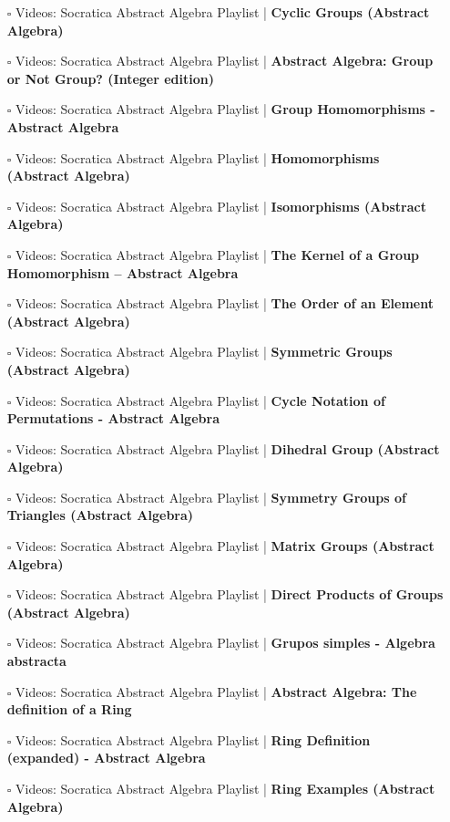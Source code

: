 \documentclass[a4, landscape, 12pt]{article}
\newcommand{\checkbox}{$\square$}%
\begin{document}
\begin{itemize}
{}
\item [\checkbox] Videos: Socratica Abstract Algebra Playlist  | \textbf{Cyclic Groups (Abstract Algebra)
}
\item [\checkbox] Videos: Socratica Abstract Algebra Playlist  | \textbf{Abstract Algebra: Group or Not Group? (Integer edition)
}
\item [\checkbox] Videos: Socratica Abstract Algebra Playlist  | \textbf{Group Homomorphisms - Abstract Algebra
}
\item [\checkbox] Videos: Socratica Abstract Algebra Playlist  | \textbf{Homomorphisms (Abstract Algebra)
}
\item [\checkbox] Videos: Socratica Abstract Algebra Playlist  | \textbf{Isomorphisms (Abstract Algebra)
}
\item [\checkbox] Videos: Socratica Abstract Algebra Playlist  | \textbf{The Kernel of a Group Homomorphism – Abstract Algebra
}
\item [\checkbox] Videos: Socratica Abstract Algebra Playlist  | \textbf{The Order of an Element (Abstract Algebra)
}
\item [\checkbox] Videos: Socratica Abstract Algebra Playlist  | \textbf{Symmetric Groups (Abstract Algebra)
}
\item [\checkbox] Videos: Socratica Abstract Algebra Playlist  | \textbf{Cycle Notation of Permutations - Abstract Algebra
}
\item [\checkbox] Videos: Socratica Abstract Algebra Playlist  | \textbf{Dihedral Group (Abstract Algebra)
}
\item [\checkbox] Videos: Socratica Abstract Algebra Playlist  | \textbf{Symmetry Groups of Triangles (Abstract Algebra)
}
\item [\checkbox] Videos: Socratica Abstract Algebra Playlist  | \textbf{Matrix Groups (Abstract Algebra)
}
\item [\checkbox] Videos: Socratica Abstract Algebra Playlist  | \textbf{Direct Products of Groups (Abstract Algebra)
}
\item [\checkbox] Videos: Socratica Abstract Algebra Playlist  | \textbf{Grupos simples - Algebra abstracta
}
\item [\checkbox] Videos: Socratica Abstract Algebra Playlist  | \textbf{Abstract Algebra: The definition of a Ring
}
\item [\checkbox] Videos: Socratica Abstract Algebra Playlist  | \textbf{Ring Definition (expanded) - Abstract Algebra
}
\item [\checkbox] Videos: Socratica Abstract Algebra Playlist  | \textbf{Ring Examples (Abstract Algebra)
}
\end{itemize}
\end{document}
